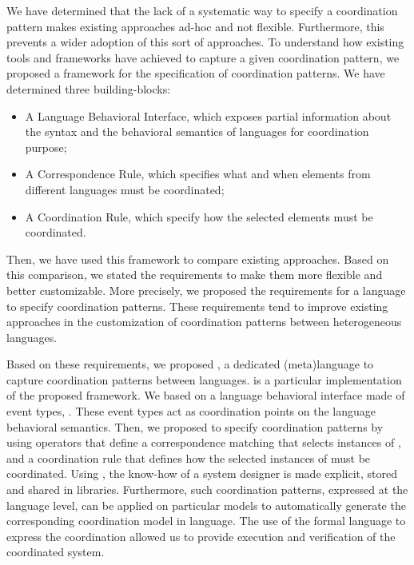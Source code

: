 We have determined that the lack of a systematic way to specify a coordination pattern makes existing approaches ad-hoc and not flexible. Furthermore, this prevents a wider adoption of this sort of approaches. To understand how existing tools and frameworks have achieved to capture a given coordination pattern, we proposed a framework for the specification of coordination patterns. We have determined three building-blocks:

	\begin{itemize}
	\item A Language Behavioral Interface, which exposes partial information about the syntax and the behavioral semantics of languages for coordination purpose; 
	
	\item A Correspondence Rule, which specifies what and when elements from different languages must be coordinated;
	
	\item A Coordination Rule, which specify how the selected elements must be coordinated. 
\end{itemize}

Then, we have used this framework to compare existing approaches. Based on this comparison, we stated the requirements to make them more flexible and better customizable. More precisely, we proposed the requirements for a language to specify coordination patterns. These requirements tend to improve existing approaches in the customization of coordination patterns between heterogeneous languages.

Based on these requirements, we proposed \bcool, a dedicated (meta)language to capture coordination patterns between languages. \bcool is a particular implementation of the proposed framework. We based on a language behavioral interface made of event types, \ie \dse. These event types act as coordination points on the language behavioral semantics. Then, we proposed to specify coordination patterns by using operators that define a correspondence matching that selects instances of \dse, and a coordination rule that defines how the selected instances of \dse must be coordinated. Using \bcool, the know-how of a system designer is made explicit, stored and shared in libraries. Furthermore, such coordination patterns, expressed at the language level, can be applied on particular models to automatically generate the corresponding coordination model in \ccsl language. The use of the formal \ccsl language to express the coordination allowed us to provide execution and verification of the coordinated system.
	
